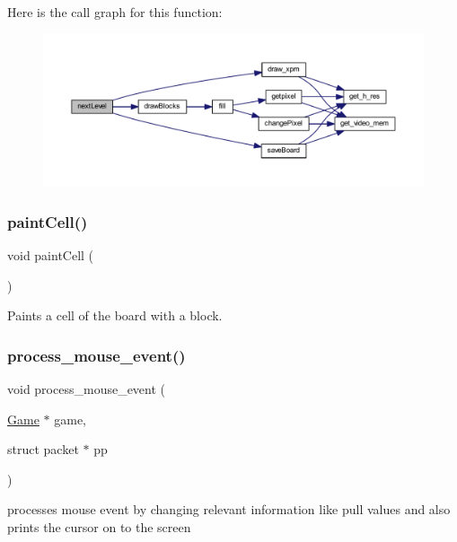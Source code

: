 Here is the call graph for this function\+:
\nopagebreak
\begin{figure}[H]
\begin{center}
\leavevmode
\includegraphics[width=350pt]{group__game_gac165fe517b083b5ccd861bf028a67b7e_cgraph}
\end{center}
\end{figure}
\mbox{\label{group__game_gac9ffb5de47cf14e382f2f7c0f359eb39}} 
\subsubsection{\texorpdfstring{paintCell()}{paintCell()}}
{\footnotesize\ttfamily void paint\+Cell (\begin{DoxyParamCaption}{ }\end{DoxyParamCaption})}



Paints a cell of the board with a block. 

\mbox{\label{group__game_gad54324212d792e38302b19e409a413ae}} 
\subsubsection{\texorpdfstring{process\_mouse\_event()}{process\_mouse\_event()}}
{\footnotesize\ttfamily void process\+\_\+mouse\+\_\+event (\begin{DoxyParamCaption}\item[{\mbox{\hyperlink{struct_game}{Game}} $\ast$}]{game,  }\item[{struct packet $\ast$}]{pp }\end{DoxyParamCaption})}



processes mouse event by changing relevant information like pull values and also prints the cursor on to the screen 


